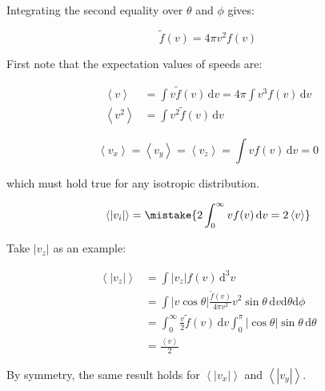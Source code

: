 \documentclass[12pt]{article}
\begin{document}
Integrating the second equality over $\theta$ and $\phi$ gives:

\begin{equation}
    \tilde{f}(v) = 4\pi v^{2} f(v)
\end{equation}

First note that the expectation values of speeds are:

\begin{equation}
    \begin{split}
        \left\langle v \right\rangle &= \int v \tilde{f}(v) \, \mathrm{d}v = 4\pi \int v^{3} f(v) \, \mathrm{d}v \\
        \left\langle v^{2} \right\rangle &= \int v^{2} \tilde{f}(v) \, \mathrm{d}v
    \end{split}
\end{equation}


\begin{equation}
    \left\langle v_{x} \right\rangle = \left\langle v_{y} \right\rangle = \left\langle v_{z} \right\rangle = \int v f(v) \, \mathrm{d}v = 0
\end{equation}

which must hold true for any isotropic distribution.


\begin{equation}
    \left\langle \left\lvert v_{i} \right\rvert \right\rangle = \mistake{2\int_{0}^{\infty} v f(v) \, \mathrm{d}v = 2 \left\langle v \right\rangle}
\end{equation}

\begin{correction}
    Take $\left\lvert v_{z} \right\rvert$ as an example:

    \begin{equation}
        \begin{split}
            \left\langle \left\lvert v_{z} \right\rvert \right\rangle &= \int \left\lvert v_{z} \right\rvert f(v) \, \mathrm{d}^{3}v \\
            &= \int \left\lvert v \cos{\theta} \right\rvert \frac{\tilde{f}(v)}{4\pi v^{2}} v^{2} \sin{\theta} \, \mathrm{d}v \mathrm{d}\theta \mathrm{d}\phi \\
            &= \int_{0}^{\infty} \frac{v}{2} \tilde{f}(v) \, \mathrm{d}v \int_{0}^{\pi} \left\lvert \cos{\theta} \right\rvert \sin{\theta} \, \mathrm{d}\theta \\
            &= \frac{\left\langle v \right\rangle}{2}
        \end{split}
    \end{equation}

    By symmetry, the same result holds for $\left\langle \left\lvert v_{x} \right\rvert \right\rangle$ and $\left\langle \left\lvert v_{y} \right\rvert \right\rangle$.
\end{correction}
\end{document}
